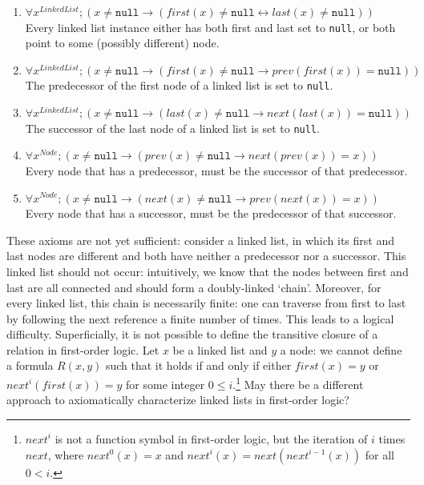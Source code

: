 \documentclass[runningheads]{llncs}
\begin{document}
\begin{enumerate}
    \item $\forall x^\mathit{LinkedList}; (x \neq \mathtt{null} \to (\mathit{first}(x) \neq \mathtt{null} \leftrightarrow \mathit{last}(x) \neq \mathtt{null}))$\\
    Every linked list instance either has both first and last set to \texttt{null}, or both point to some (possibly different) node.
    \item $\forall x^\mathit{LinkedList}; (x \neq \mathtt{null} \to (\mathit{first}(x) \neq \mathtt{null} \to \mathit{prev}(\mathit{first}(x)) = \mathtt{null}))$\\
    The predecessor of the first node of a linked list is set to \texttt{null}.
    \item\label{item:axiom-last} $\forall x^\mathit{LinkedList}; (x \neq \mathtt{null} \to (\mathit{last}(x) \neq \mathtt{null} \to \mathit{next}(\mathit{last}(x)) = \mathtt{null}))$\\
    The successor of the last node of a linked list is set to \texttt{null}.
    \item\label{item:axiom-pred} $\forall x^\mathit{Node}; (x \neq \mathtt{null} \to (\mathit{prev}(x) \neq \mathtt{null} \to \mathit{next}(\mathit{prev}(x)) = x))$\\
    Every node that has a predecessor, must be the successor of that predecessor.
    \item\label{item:axiom-succ} $\forall x^\mathit{Node}; (x \neq \mathtt{null} \to (\mathit{next}(x) \neq \mathtt{null} \to \mathit{prev}(\mathit{next}(x)) = x))$\\
    Every node that has a successor, must be the predecessor of that successor.
\end{enumerate}

These axioms are not yet sufficient: consider a linked list, in which its first and last nodes are different and both have neither a predecessor nor a successor. This linked list should not occur: intuitively, we know that the nodes between first and last are all connected and should form a doubly-linked `chain'. Moreover, for every linked list, this chain is necessarily finite: one can traverse from first to last by following the next reference a finite number of times. This leads to a logical difficulty. Superficially, it is not possible to define the transitive closure of a relation in first-order logic. Let $x$ be a linked list and $y$ a node: we cannot define a formula $R(x,y)$ such that it holds if and only if either $\mathit{first}(x)=y$ or $\mathit{next}^i(\mathit{first}(x))=y$ for some integer $0\leq i$.\footnote{$\mathit{next}^i$ is not a function symbol in first-order logic, but the iteration of $i$ times $\mathit{next}$, where $\mathit{next}^0(x)=x$ and $\mathit{next}^i(x)=next(\mathit{next}^{i-1}(x))$ for all $0<i$.} May there be a different approach to axiomatically characterize linked lists in first-order logic?
\end{document}
